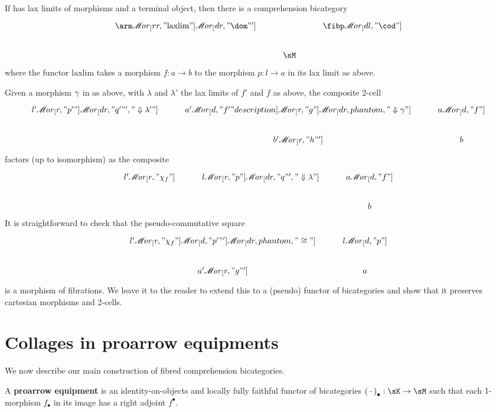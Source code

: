 \documentclass{amsart}
\def\ar#1{\mathscr{M}\!\mathit{or}_{#1}}
\def\rep#1{{#1}_\bullet}
\def\corep#1{{#1}^\bullet}
\begin{document}
\begin{prob}\label{thm:arm-ccbicat}
  If \sM has lax limits of morphisms and a terminal object, then there is a comprehension bicategory
  \[
  \begin{tikzcd}
    \arm \ar[rr,"\mathrm{laxlim}"] \ar[dr,"\dom"'] && \fibp \ar[dl,"\cod"] \\
    &\sM
  \end{tikzcd}
  \]
  where the functor $\mathrm{laxlim}$ takes a morphism $f:a\to b$ to the morphism $p:l\to a$ in its lax limit as above.
\end{prob}
\begin{constr}
  Given a morphism $\gamma$ in \arm as above, with $\lambda$ and $\lambda'$ the lax limits of $f'$ and $f$ as above, the composite 2-cell
  \[
  \begin{tikzcd}
    l' \ar[r,"p'"]\ar[dr,"q'"',"\Downarrow\lambda'"] &
    a' \ar[d,"f'" description] \ar[r,"g"] \ar[dr,phantom,"\Downarrow \gm"] & a \ar[d,"f"] \\
    & b' \ar[r,"h"'] & b
  \end{tikzcd}
  \]
  factors (up to isomorphism) as the composite
  \[
  \begin{tikzcd}
    l' \ar[r,"\chi_f"] & l \ar[r,"p"] \ar[dr,"q"',"\Downarrow\lambda"] & a \ar[d,"f"] \\ && b
  \end{tikzcd}
  \]
  It is straightforward to check that the pseudo-commutative square
  \[
  \begin{tikzcd}
    l' \ar[r,"\chi_f"] \ar[d,"p'"'] \ar[dr,phantom,"\cong"] & l \ar[d,"p"] \\ a' \ar[r,"g"'] & a
  \end{tikzcd}
  \]
  is a morphism of fibrations.
  We leave it to the reader to extend this to a (pseudo) functor of bicategories and show that it preserves cartesian morphisms and 2-cells.
\end{constr}


\section{Collages in proarrow equipments}
\label{sec:equip}

We now describe our main construction of fibred comprehension bicategories.

\begin{defn}
  A \textbf{proarrow equipment} is an identity-on-objects and locally fully faithful functor of bicategories $\rep{(\blank)} : \sK\to\sM$ such that each 1-morphism $\rep f$ in its image has a right adjoint $\corep f$.
\end{defn}
\end{document}
